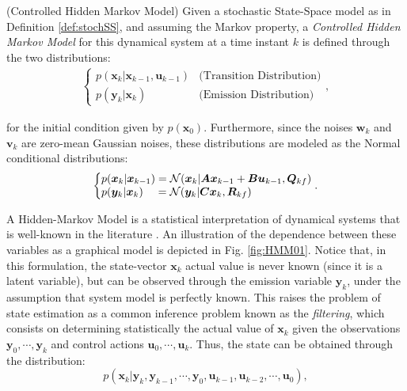 \documentclass[a4paper,11pt]{book}
\numberwithin{figure}{chapter}
\numberwithin{equation}{chapter}
\numberwithin{table}{chapter}
\theoremstyle{definition}
\newtheorem{definition}{Definition}[chapter]
\newcounter{boxed-theorem}
\newcounter{boxed-lemma}
\newcounter{boxed-definition}
\newenvironment{boxed-definition}[1]
{\colorlet{shadecolor}{pastelYellow!15} \begin{shaded} \begin{definition}{#1}}
{\end{definition} \end{shaded}}
\newcounter{boxed-example}
\begin{document}
\begin{boxed-definition}{(Controlled Hidden Markov Model)} \label{def:HMM}
    Given a stochastic State-Space model as in Definition \ref{def:stochSS}, and assuming the Markov property, a \textit{Controlled Hidden Markov Model} for this dynamical system at a time instant $k$ is defined through the two distributions:
    \begin{align}
    \begin{cases}
        p(\bm{x}_{k} | \bm{x}_{k-1}, \bm{u}_{k-1}) & \text{(Transition Distribution)} \\
        p(\bm{y}_{k} | \bm{x}_{k}) & \text{(Emission Distribution)}
    \end{cases}
    ,\end{align}
    
    \noindent for the initial condition given by $p(\bm{x}_0)$. Furthermore, since the noises $\bm{w}_k$ and $\bm{v}_k$ are zero-mean Gaussian noises, these distributions are modeled as the Normal conditional distributions:
    \begin{align}
    \left\{ \begin{matrix*}[l]
        p(\bm{x}_{k} | \bm{x}_{k-1}) = \mathcal{N}(\bm{x}_k | \bm{A}\bm{x}_{k-1} + \bm{B}\bm{u}_{k-1}, \bm{Q}_{kf}) \\
         p(\bm{y}_{k} | \bm{x}_{k})\phantom{_{-1}} = \mathcal{N}(\bm{y}_k | \bm{C}\bm{x}_{k}, \bm{R}_{kf}) \hfill
    \end{matrix*} \right.
    .\end{align}
\end{boxed-definition}

A Hidden-Markov Model is a statistical interpretation of dynamical systems that is well-known in the literature \cite{Barber:2012}. An illustration of the dependence between these variables as a graphical model is depicted in Fig. \ref{fig:HMM01}. Notice that, in this formulation, the state-vector $\bm{x}_k$ actual value is never known (since it is a latent variable), but can be observed through the emission variable $\bm{y}_k$, under the assumption that system model is perfectly known. This raises the problem of state estimation as a common inference problem known as the \textit{filtering}, which consists on determining statistically the actual value of $\bm{x}_k$ given the observations $\bm{y}_0, \cdots, \bm{y}_k$ and control actions $\bm{u}_0, \cdots, \bm{u}_k$. Thus, the state can be obtained through the distribution:
\begin{equation}
    p(\bm{x}_k | \bm{y}_{k}, \bm{y}_{k-1}, \cdots, \bm{y}_0, \bm{u}_{k-1}, \bm{u}_{k-2}, \cdots, \bm{u}_0)
,\end{equation}
\end{document}
